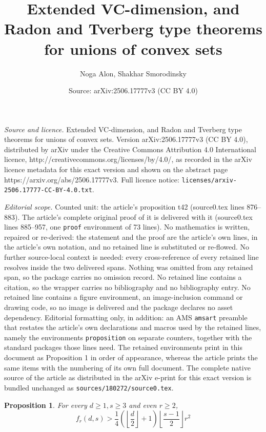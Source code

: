 \documentclass[10pt,a4paper]{amsart}
\title{Extended VC-dimension, and Radon and Tverberg type theorems for unions of convex sets}
\author{Noga Alon, Shakhar Smorodinsky}
\date{Source: arXiv:2506.17777v3 (CC BY 4.0)}
\newtheorem{proposition}{Proposition}
\begin{document}
\maketitle

\noindent\emph{Source and licence.} Extended VC-dimension, and Radon and Tverberg type theorems for unions of convex sets. Version arXiv:2506.17777v3 (CC BY 4.0), distributed by arXiv under the Creative Commons Attribution 4.0 International licence, http://creativecommons.org/licenses/by/4.0/, as recorded in the arXiv licence metadata for this exact version and shown on the abstract page https://arxiv.org/abs/2506.17777v3. Full licence notice: \texttt{licenses/arxiv-2506.17777-CC-BY-4.0.txt}.\par\smallskip

\noindent\textit{Editorial scope.} Counted unit: the article's proposition t42 (source0.tex lines 876--883). The article's complete original proof of it is delivered with it (source0.tex lines 885--957, one \texttt{proof} environment of 73 lines). No mathematics is written, repaired or re-derived: the statement and the proof are the article's own lines, in the article's own notation, and no retained line is substituted or re-flowed.  No further source-local context is needed: every cross-reference of every retained line resolves inside the two delivered spans.  Nothing was omitted from any retained span, so the package carries no omission record.  No retained line contains a citation, so the wrapper carries no bibliography and no bibliography entry.  No retained line contains a figure environment, an image-inclusion command or drawing code, so no image is delivered and the package declares no asset dependency.  Editorial formatting only, in addition: an AMS \texttt{amsart} preamble that restates the article's own declarations and macros used by the retained lines, namely the environments \texttt{proposition} on separate counters, together with the standard packages those lines need.  The retained environments print in this document as Proposition 1 in order of appearance, whereas the article prints the same items with the numbering of its own full document.  The complete native source of the article as distributed in the arXiv e-print for this exact version is bundled unchanged as \texttt{sources/180272/source0.tex}.
\begin{proposition}
\label{t42}
For every $d \geq 1, s \geq 3$ and even $r \geq 2$,
$$
f_r(d,s) > \frac{1}{4} \left ( \left \lfloor \frac{d}{2}\right \rfloor+1\right)
\left \lfloor \frac{s-1}{2} \right \rfloor r^2
$$
\end{proposition}
\end{document}
